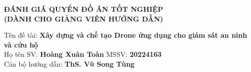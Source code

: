 \normalfont
\thispagestyle{empty}
\begin{center}
    \textbf{\fontsize{14pt}{16pt}\selectfont ĐÁNH GIÁ QUYỂN ĐỒ ÁN TỐT NGHIỆP}\\
    \textbf{\fontsize{12pt}{14pt}\selectfont (DÀNH CHO GIẢNG VIÊN HƯỚNG DẪN)}
\end{center}

\vspace{10pt}
\noindent Tên đề tài: \textbf{Xây dựng và chế tạo Drone ứng dụng cho giám sát an ninh và cứu hộ} \\[8pt]
\noindent Họ tên SV: \textbf{Hoàng Xuân Toàn} \hspace{3.5cm} MSSV: \textbf{20224163} \\[8pt]
\noindent Cán bộ hướng dẫn: \textbf{ThS. Vũ Song Tùng}

\vspace{10pt}

